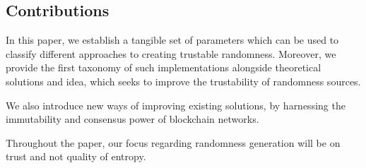 \subsection*{Contributions}\label{subsec:contributions}
In this paper, we establish a tangible set of parameters which can be used to classify different approaches to creating trustable randomness.
Moreover, we provide the first taxonomy of such implementations alongside theoretical solutions and idea, which seeks to improve the trustability of randomness sources.

We also introduce new ways of improving existing solutions, by harnessing the immutability and consensus power of blockchain networks.

Throughout the paper, our focus regarding randomness generation will be on trust and not quality of entropy.







